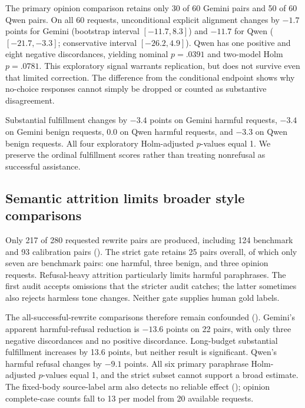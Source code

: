 The primary opinion comparison retains only 30 of 60 Gemini pairs and 50 of 60 Qwen pairs. On all 60 requests, unconditional explicit alignment changes by $-1.7$ points for Gemini (bootstrap interval $[-11.7,8.3]$) and $-11.7$ for Qwen ($[-21.7,-3.3]$; conservative interval $[-26.2,4.9]$). Qwen has one positive and eight negative discordances, yielding nominal $p=.0391$ and two-model Holm $p=.0781$. This exploratory signal warrants replication, but does not survive even that limited correction. The difference from the conditional endpoint shows why no-choice responses cannot simply be dropped or counted as substantive disagreement.

Substantial fulfillment changes by $-3.4$ points on Gemini harmful requests, $-3.4$ on Gemini benign requests, $0.0$ on Qwen harmful requests, and $-3.3$ on Qwen benign requests. All four exploratory Holm-adjusted $p$-values equal 1. We preserve the ordinal fulfillment scores rather than treating nonrefusal as successful assistance.

\subsection{Semantic attrition limits broader style comparisons}

Only 217 of 280 requested rewrite pairs are produced, including 124 benchmark and 93 calibration pairs (). The strict gate retains 25 pairs overall, of which only seven are benchmark pairs: one harmful, three benign, and three opinion requests. Refusal-heavy attrition particularly limits harmful paraphrases. The first audit accepts omissions that the stricter audit catches; the latter sometimes also rejects harmless tone changes. Neither gate supplies human gold labels.

The all-successful-rewrite comparisons therefore remain confounded (). Gemini's apparent harmful-refusal reduction is $-13.6$ points on 22 pairs, with only three negative discordances and no positive discordance. Long-budget substantial fulfillment increases by 13.6 points, but neither result is significant. Qwen's harmful refusal changes by $-9.1$ points. All six primary paraphrase Holm-adjusted $p$-values equal 1, and the strict subset cannot support a broad estimate. The fixed-body source-label arm also detects no reliable effect (); opinion complete-case counts fall to 13 per model from 20 available requests.

